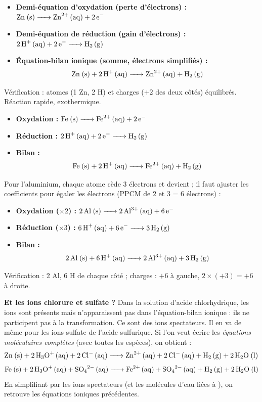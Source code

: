 \documentclass[11pt]{article}
\newcommand{\cle}[1]{{\popxbold\color{popdark}#1}}
\begin{document}
\begin{propriete}
\begin{itemize}
\item \textbf{Demi-équation d'oxydation (perte d'électrons) :} $\ce{Zn (s) -> Zn^2+ (aq) + 2e-}$
\item \textbf{Demi-équation de réduction (gain d'électrons) :} $\ce{2H+ (aq) + 2e- -> H2 (g)}$
\item \textbf{Équation-bilan ionique (somme, électrons simplifiés) :}
\[ \ce{Zn (s) + 2H+ (aq) -> Zn^2+ (aq) + H2 (g)} \]
\end{itemize}
Vérification : atomes (1 Zn, 2 H) et charges ($+2$ des deux côtés) équilibrés. Réaction rapide, exothermique.
\end{propriete}

\begin{propriete}
\begin{itemize}
\item \textbf{Oxydation :} $\ce{Fe (s) -> Fe^2+ (aq) + 2e-}$
\item \textbf{Réduction :} $\ce{2H+ (aq) + 2e- -> H2 (g)}$
\item \textbf{Bilan :}
\[ \ce{Fe (s) + 2H+ (aq) -> Fe^2+ (aq) + H2 (g)} \]
\end{itemize}
\end{propriete}

Pour l'aluminium, chaque atome cède 3 électrons et devient  ; il faut ajuster les coefficients pour égaler les électrons (PPCM de 2 et 3 = 6 électrons) :
\begin{itemize}
\item \textbf{Oxydation ($\times 2$) :} $\ce{2Al (s) -> 2Al^3+ (aq) + 6e-}$
\item \textbf{Réduction ($\times 3$) :} $\ce{6H+ (aq) + 6e- -> 3H2 (g)}$
\item \textbf{Bilan :}
\[ \ce{2Al (s) + 6H+ (aq) -> 2Al^3+ (aq) + 3H2 (g)} \]
\end{itemize}
Vérification : 2 Al, 6 H de chaque côté ; charges : $+6$ à gauche, $2\times(+3)=+6$ à droite.

\textbf{Et les ions chlorure et sulfate ?} Dans la solution d'acide chlorhydrique, les ions  sont présents mais n'apparaissent pas dans l'équation-bilan ionique : ils ne participent pas à la transformation. Ce sont des \cle{ions spectateurs}. Il en va de même pour les ions sulfate  de l'acide sulfurique. Si l'on veut écrire les \emph{équations moléculaires complètes} (avec toutes les espèces), on obtient :
\[ \ce{Zn (s) + 2H3O+ (aq) + 2Cl- (aq) -> Zn^2+ (aq) + 2Cl- (aq) + H2 (g) + 2H2O (l)} \]
\[ \ce{Fe (s) + 2H3O+ (aq) + SO4^2- (aq) -> Fe^2+ (aq) + SO4^2- (aq) + H2 (g) + 2H2O (l)} \]
En simplifiant par les ions spectateurs (et les molécules d'eau liées à ), on retrouve les équations ioniques précédentes.
\end{document}
